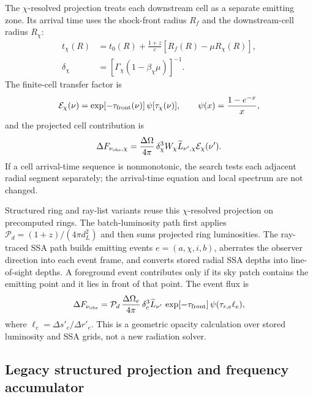 \documentclass[twocolumn]{aastex702}
\begin{document}
The \(\chi\)-resolved projection treats each downstream cell as a separate
emitting zone.  Its arrival time uses the shock-front radius \(R_f\) and the
downstream-cell radius \(R_\chi\):
\begin{equation}
\begin{aligned}
t_\chi(R)&=t_0(R)+\frac{1+z}{c}
\left[R_f(R)-\mu R_\chi(R)\right],
\\
\delta_\chi&=\left[\Gamma_\chi(1-\beta_\chi\mu)\right]^{-1}.
\end{aligned}
\end{equation}
The finite-cell transfer factor is
\begin{equation}
\mathcal{E}_\chi(\nu)=
\exp[-\tau_{\rm front}(\nu)]\,\psi[\tau_\chi(\nu)],
\qquad
\psi(x)=\frac{1-e^{-x}}{x},
\end{equation}
and the projected cell contribution is
\begin{equation}
\Delta F_{\nu_{\rm obs},\chi}=
\frac{\Delta\Omega}{4\pi}\,
\delta_\chi^3 W_\chi
\widetilde L_{\nu',\chi}\mathcal{E}_\chi(\nu').
\end{equation}
If a cell arrival-time sequence is nonmonotonic, the search tests each adjacent
radial segment separately; the arrival-time equation and local spectrum are not
changed.

Structured ring and ray-list variants reuse this \(\chi\)-resolved projection on
precomputed rings.  The batch-luminosity path first applies
\(\mathcal P_d=(1+z)/(4\pi d_L^2)\) and then sums projected ring luminosities.
The ray-traced SSA path builds emitting events \(e=(a,\chi,i,b)\), aberrates the
observer direction into each event frame, and converts stored radial SSA depths
into line-of-sight depths.  A foreground event contributes only if its sky patch
contains the emitting point and it lies in front of that point.  The event flux is
\begin{equation}
\Delta F_{\nu_{\rm obs}}=
\mathcal{P}_d\,\frac{\Delta\Omega_e}{4\pi}\,\delta_e^3
\widetilde L_{\nu'}\,
\exp[-\tau_{\rm front}]\,\psi(\tau_{r,e}\ell_e),
\end{equation}
where \(\ell_e=\Delta s'_e/\Delta r'_e\).  This is a geometric opacity
calculation over stored luminosity and SSA grids, not a new radiation solver.

\subsection{Legacy structured projection and frequency accumulator}
\end{document}
